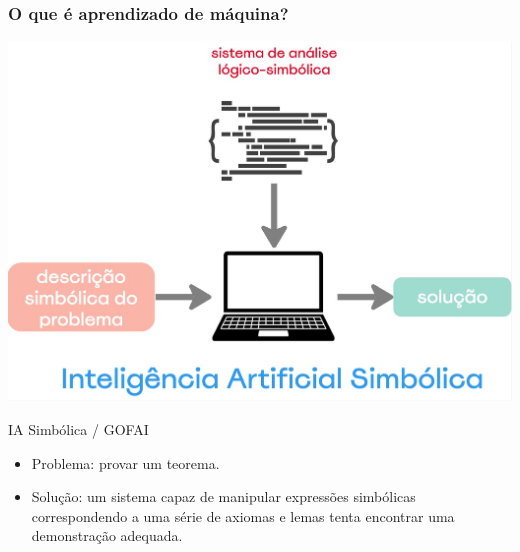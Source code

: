 \begin{frame}
    \frametitle{O que é aprendizado de máquina?}
    \begin{center}
        \includegraphics[height=0.4\paperheight]{./imgs/fig4-ai-simbolica.jpg}
    \end{center}
    \begin{block}{IA Simbólica / GOFAI}
        \begin{itemize}
            \item Problema: provar um teorema. 
            \item Solução: um sistema capaz de manipular expressões simbólicas correspondendo a uma série de axiomas 
            e lemas tenta encontrar uma demonstração adequada.
        \end{itemize}            
    \end{block}
\end{frame}


